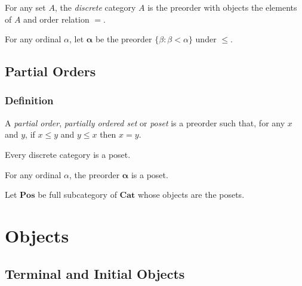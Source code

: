 \begin{ex}
For any set $A$, the \emph{discrete} category $A$ is the preorder with objects the elements of $A$ and order relation $=$.
\end{ex}

\begin{ex}
For any ordinal $\alpha$, let $\mathbf{\alpha}$ be the preorder $\{ \beta : \beta < \alpha \}$ under $\leq$.
\end{ex}




\section{Partial Orders}

\subsection{Definition}

\begin{df}
A \emph{partial order}, \emph{partially ordered set} or \emph{poset} is a preorder such that, for any $x$ and $y$, if $x \leq y$ and $y \leq x$ then $x = y$.
\end{df}

\begin{ex}
Every discrete category is a poset.
\end{ex}

\begin{ex}
For any ordinal $\alpha$, the preorder $\mathbf{\alpha}$ is a poset.
\end{ex}

\begin{df}
Let $\mathbf{Pos}$ be full subcategory of $\mathbf{Cat}$ whose objects are the posets.
\end{df}


\chapter{Objects}


\section{Terminal and Initial Objects}

